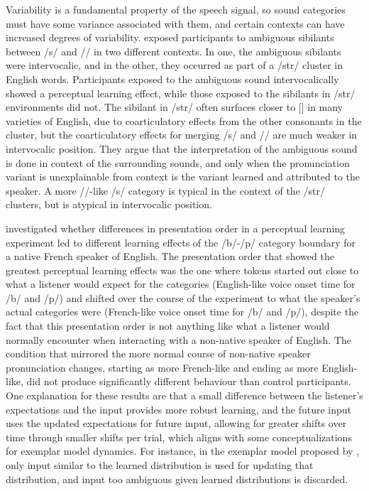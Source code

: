 Variability is a fundamental property of the speech signal, so sound categories must have some variance associated with them, and certain contexts can have increased degrees of variability.
\citet{Kraljic2008a} exposed participants to ambiguous sibilants between /s/ and /\textesh/ in two different contexts.  
In one, the ambiguous sibilants were intervocalic, and in the other, they occurred as part of a /str/ cluster in English words.  
Participants exposed to the ambiguous sound intervocalically showed a perceptual learning effect, while those exposed to the sibilants in /str/ environments did not.  
The sibilant in /str/ often surfaces closer to [\textesh] in many varieties of English, due to coarticulatory effects from the other consonants in the cluster, but the coarticulatory effects for merging /s/ and /\textesh/ are much weaker in intervocalic position.  
They argue that the interpretation of the ambiguous sound is done in context of the surrounding sounds, and only when the pronunciation variant is unexplainable from context is the variant learned and attributed to the speaker\citet[see also][]{Kraljic2008}.
A more /\textesh/-like /s/ category is typical in the context of the /str/ clusters, but is atypical in intervocalic position.

\citet{Sumner2011} investigated whether differences in presentation order in a perceptual learning experiment led to different learning effects of the /b/-/p/ category boundary for a native French speaker of English.  
The presentation order that showed the greatest perceptual learning effects was the one where tokens started out close to what a listener would expect for the categories (English-like voice onset time for /b/ and /p/) and shifted over the course of the experiment to what the speaker's actual categories were (French-like voice onset time for /b/ and /p/), despite the fact that this presentation order is not anything like what a listener would normally encounter when interacting with a non-native speaker of English.  
The condition that mirrored the more normal course of non-native speaker pronunciation changes, starting as more French-like and ending as more English-like, did not produce significantly different behaviour than control participants.  
One explanation for these results are that a small difference between the listener's expectations and the input provides more robust learning, and the future input uses the updated expectations for future input, allowing for greater shifts over time through smaller shifts per trial, which aligns with some conceptualizations for exemplar model dynamics.
For instance, in the exemplar model proposed by \citet{Pierrehumbert2001}, only input similar to the learned distribution is used for updating that distribution, and input too ambiguous given learned distributions is discarded.

